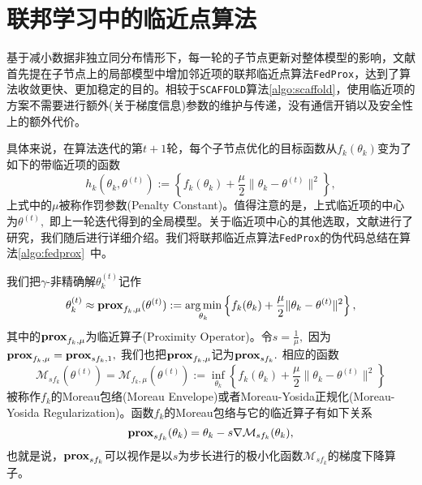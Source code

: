 \section{联邦学习中的临近点算法}
\label{sec:chap2-ppa}

基于减小数据非独立同分布情形下，每一轮的子节点更新对整体模型的影响，文献\parencite{sahu2018fedprox}首先提在子节点上的局部模型中增加邻近项的联邦临近点算法\texttt{FedProx}，达到了算法收敛更快、更加稳定的目的。相较于\texttt{SCAFFOLD}算法\ref{algo:scaffold}，使用临近项的方案不需要进行额外(关于梯度信息)参数的维护与传递，没有通信开销以及安全性上的额外代价。

具体来说，在算法迭代的第$t+1$轮，每个子节点优化的目标函数从$f_k(\theta_k)$变为了如下的带临近项的函数
\begin{equation}
\label{eq:fedprox}
h_k(\theta_k, \theta^{(t)}) := \left\{ f_k(\theta_k) + \frac{\mu}{2} \lVert \theta_k - \theta^{(t)} \rVert^2  \right\},
\end{equation}
上式中的$\mu$被称作罚参数(Penalty Constant)。值得注意的是，上式临近项的中心为$\theta^{(t)},$ 即上一轮迭代得到的全局模型。关于临近项中心的其他选取，文献\parencite{hanzely2020federated,li_2021_ditto}进行了研究，我们随后进行详细介绍。我们将联邦临近点算法\texttt{FedProx}的伪代码总结在算法\ref{algo:fedprox}~中。



我们把$\gamma$-非精确解$\theta_k^{(t)}$记作
\begin{equation}
\label{eq:prox-op}
\theta_k^{(t)} \approx \mathbf{prox}_{f_k, \mu} (\theta^{(t)}) := \operatorname*{arg\,min}\limits_{\theta_k} \left\{ f_k(\theta_k) + \frac{\mu}{2} \lVert \theta_k - \theta^{(t)} \rVert^2 \right\},
\end{equation}
其中的$\mathbf{prox}_{f_k, \mu}$为临近算子(Proximity Operator)\cite{Moreau_1965_prox}。令$s = \frac{1}{\mu},$ 因为$\mathbf{prox}_{f_k, \mu} = \mathbf{prox}_{sf_k, 1},$ 我们也把$\mathbf{prox}_{f_k, \mu}$记为$\mathbf{prox}_{sf_k}.$ 相应的函数
\begin{equation}
\label{eq:moreau_env}
\mathcal{M}_{sf_k} (\theta^{(t)}) = \mathcal{M}_{f_k, \mu} (\theta^{(t)}) := \inf\limits_{\theta_k} \left\{ f_k(\theta_k) + \frac{\mu}{2} \lVert \theta_k - \theta^{(t)} \rVert^2 \right\}
\end{equation}
被称作$f_k$的Moreau包络(Moreau Envelope)或者Moreau-Yosida正规化(Moreau-Yosida Regularization)。函数$f_k$的Moreau包络与它的临近算子有如下关系\cite{Parikh_2014_pa}
\begin{equation*}
\mathbf{prox}_{sf_k} (\theta_k) = \theta_k - s \nabla \mathcal{M}_{sf_k} (\theta_k),
\end{equation*}
也就是说，$\mathbf{prox}_{sf_k}$可以视作是以$s$为步长进行的极小化函数$\mathcal{M}_{sf_k}$的梯度下降算子。

